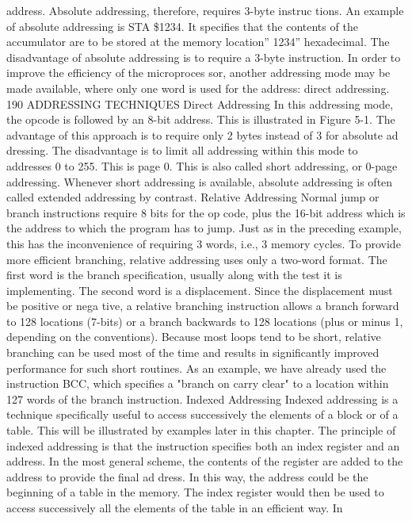 \documentclass{book}
\begin{document}
address. Absolute addressing, therefore, requires 3-byte instruc
tions. An example of absolute addressing is STA \$1234.
It specifies that the contents of the accumulator are to be stored
at the memory location'' 1234'' hexadecimal.
The disadvantage of absolute addressing is to require a 3-byte
instruction. In order to improve the efficiency of the microproces
sor, another addressing mode may be made available, where only
one word is used for the address: direct addressing.
190
ADDRESSING TECHNIQUES
Direct Addressing
In this addressing mode, the opcode is followed by an 8-bit
address. This is illustrated in Figure 5-1. The advantage of this
approach is to require only 2 bytes instead of 3 for absolute ad
dressing. The disadvantage is to limit all addressing within this
mode to addresses 0 to 255. This is page 0. This is also called
short addressing, or 0-page addressing. Whenever short addressing
is available, absolute addressing is often called extended addressing
by contrast.
Relative Addressing
Normal jump or branch instructions require 8 bits for the op
code, plus the 16-bit address which is the address to which the
program has to jump. Just as in the preceding example, this has
the inconvenience of requiring 3 words, i.e., 3 memory cycles. To
provide more efficient branching, relative addressing uses only a
two-word format. The first word is the branch specification,
usually along with the test it is implementing. The second word is
a displacement. Since the displacement must be positive or nega
tive, a relative branching instruction allows a branch forward to
128 locations (7-bits) or a branch backwards to 128 locations (plus
or minus 1, depending on the conventions). Because most loops
tend to be short, relative branching can be used most of the time
and results in significantly improved performance for such short
routines. As an example, we have already used the instruction
BCC, which specifies a "branch on carry clear" to a location
within 127 words of the branch instruction.
Indexed Addressing
Indexed addressing is a technique specifically useful to access
successively the elements of a block or of a table. This will be
illustrated by examples later in this chapter. The principle of
indexed addressing is that the instruction specifies both an index
register and an address. In the most general scheme, the contents
of the register are added to the address to provide the final ad
dress. In this way, the address could be the beginning of a table in
the memory. The index register would then be used to access
successively all the elements of the table in an efficient way. In
\end{document}
